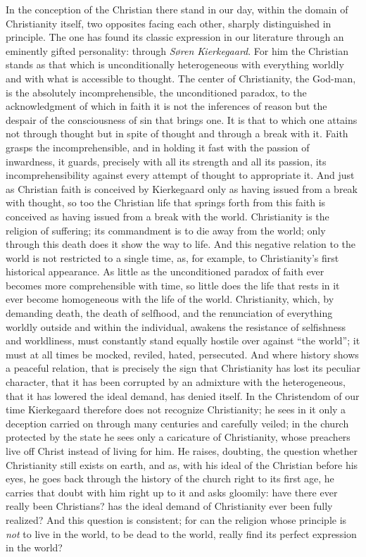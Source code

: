 \documentclass[12pt,a4paper,openany]{book}
\newcommand{\opage}[1]{\marginnote{\footnotesize\textit{[#1]}}}
\begin{document}
In the conception of the Christian there stand in our day,
within the domain of Christianity itself, two opposites
facing each other, sharply distinguished in principle. The one
has found its classic expression in our literature through an
eminently gifted personality: through \emph{Søren Kierkegaard}.
For him the Christian stands as that which is
unconditionally heterogeneous with everything worldly and with what is
accessible to thought. The center of Christianity, the God-man,
is the absolutely incomprehensible, the unconditioned
paradox, to the acknowledgment of which in faith it is not the
inferences of reason but the despair of the consciousness of sin that brings one.
It is that to which one attains not through thought but in spite
of thought and through a break with it. Faith
grasps the incomprehensible, and in holding it fast with the
passion of inwardness, it guards, precisely with all its strength
and all its passion, its incomprehensibility against every
attempt of thought to appropriate it. And just as
Christian faith is conceived by Kierkegaard only as having issued from
a break with thought, so too the Christian
life that springs forth from this faith is conceived as having issued from a
\opage{434}break with the world. Christianity is the religion of suffering;
its commandment is to die away from the world; only through this
death does it show the way to life. And this negative relation
to the world is not restricted to a single time, as, for example,
to Christianity's first historical appearance. As little
as the unconditioned paradox of faith ever becomes more comprehensible
with time, so little does the life that rests in it ever
become homogeneous with the life of the world. Christianity, which, by
demanding death, the death of selfhood, and the renunciation of everything
worldly outside and within the individual, awakens the resistance of selfishness and
worldliness, must constantly stand equally hostile
over against ``the world''; it must at all times be mocked,
reviled, hated, persecuted. And where history shows a peaceful
relation, that is precisely the sign that Christianity
has lost its peculiar character, that it has been corrupted
by an admixture with the heterogeneous, that it has lowered
the ideal demand, has denied itself. In the Christendom of our time
Kierkegaard therefore does not recognize Christianity; he
sees in it only a deception carried on through many centuries and carefully
veiled; in the church protected by the state
he sees only a caricature of Christianity, whose preachers
live off Christ instead of living for him. He
raises, doubting, the question whether Christianity still
exists on earth, and as, with his ideal of the Christian
before his eyes, he goes back through the history of the church right to its
first age, he carries that doubt with him right up to it
and asks gloomily: have there ever really been Christians?
has the ideal demand of Christianity ever been fully
realized? And this question is consistent; for can
the religion whose principle is \emph{not} to live in the world, to be dead to the world, really find its perfect expression in the world?
\end{document}
